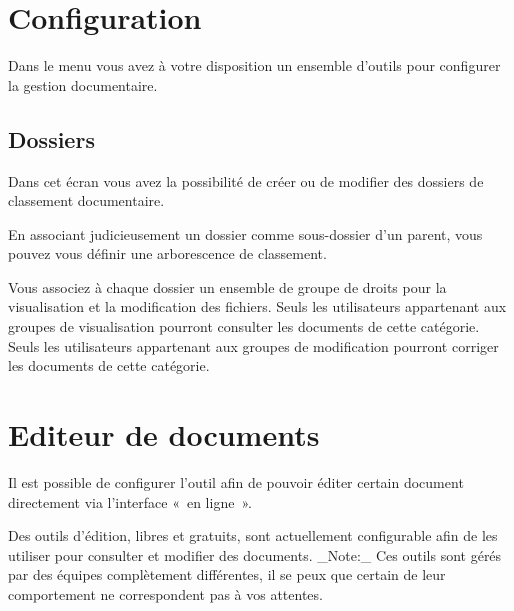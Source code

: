 \documentclass[a4paper,10pt,oneside,french]{sphinxmanual}
\begin{document}
\section{Configuration}
\label{\detokenize{documents/configuration:configuration}}\label{\detokenize{documents/configuration::doc}}
Dans le menu  vous avez à votre disposition un ensemble d’outils pour configurer la gestion documentaire.


\subsection{Dossiers}
\label{\detokenize{documents/configuration:dossiers}}
Dans cet écran vous avez la possibilité de créer ou de modifier des dossiers de classement documentaire.

\noindent{}

En associant judicieusement un dossier comme sous-dossier d’un parent, vous pouvez vous définir une arborescence de classement.

Vous associez à chaque dossier un ensemble de groupe de droits pour la visualisation et la modification des fichiers. Seuls les utilisateurs appartenant aux groupes de visualisation pourront consulter les documents de cette catégorie. Seuls les utilisateurs appartenant aux groupes de modification pourront corriger les documents de cette catégorie.


\section{Editeur de documents}
\label{\detokenize{documents/editor:editeur-de-documents}}\label{\detokenize{documents/editor::doc}}
Il est possible de configurer l’outil afin de pouvoir éditer certain document directement via l’interface « en ligne ».

Des outils d’édition, libres et gratuits, sont actuellement configurable afin de les utiliser pour consulter et modifier des documents.
\_Note:\_ Ces outils sont gérés par des équipes complètement différentes, il se peux que certain de leur comportement ne correspondent pas à vos attentes.
\end{document}
